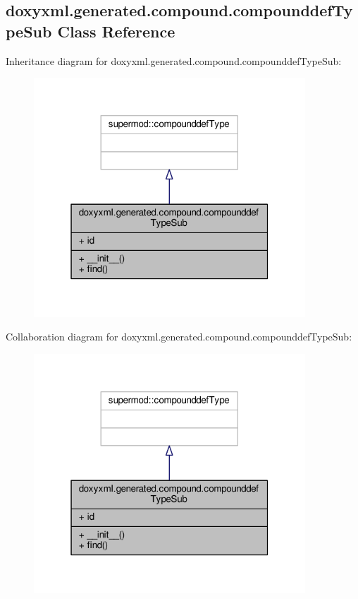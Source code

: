 \subsection{doxyxml.\+generated.\+compound.\+compounddef\+Type\+Sub Class Reference}
\label{classdoxyxml_1_1generated_1_1compound_1_1compounddefTypeSub}


Inheritance diagram for doxyxml.\+generated.\+compound.\+compounddef\+Type\+Sub\+:
\nopagebreak
\begin{figure}[H]
\begin{center}
\leavevmode
\includegraphics[width=289pt]{dc/df2/classdoxyxml_1_1generated_1_1compound_1_1compounddefTypeSub__inherit__graph}
\end{center}
\end{figure}


Collaboration diagram for doxyxml.\+generated.\+compound.\+compounddef\+Type\+Sub\+:
\nopagebreak
\begin{figure}[H]
\begin{center}
\leavevmode
\includegraphics[width=289pt]{df/d80/classdoxyxml_1_1generated_1_1compound_1_1compounddefTypeSub__coll__graph}
\end{center}
\end{figure}
